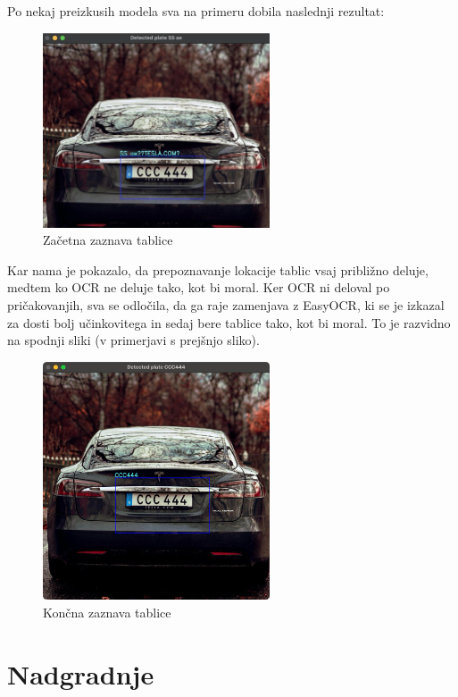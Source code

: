 \documentclass[a4paper,12pt]{article}
\begin{document}
Po nekaj preizkusih modela sva na primeru dobila naslednji rezultat:

\begin{figure}[H]
    \centering
    \includegraphics[width=0.6\textwidth]{img/plate_detection1.jpg}
    \caption{Začetna zaznava tablice}
\end{figure}

Kar nama je pokazalo, da prepoznavanje lokacije tablic vsaj približno deluje, medtem ko OCR ne deluje tako, kot bi moral. Ker OCR ni deloval po pričakovanjih, sva se odločila, da ga raje zamenjava z EasyOCR, ki se je izkazal za dosti bolj učinkovitega in sedaj bere tablice tako, kot bi moral. To je razvidno na spodnji sliki (v primerjavi s prejšnjo sliko).

\begin{figure}[H]
    \centering
    \includegraphics[width=0.6\textwidth]{img/plate_detection2.jpg}
    \caption{Končna zaznava tablice}
\end{figure}

\section*{Nadgradnje}
\end{document}
